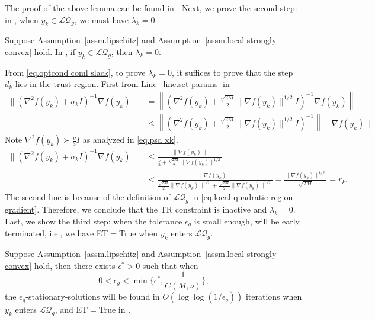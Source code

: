 \documentclass[moor,sglanonrev]{informs4}
\begin{document}
The proof of the above lemma can be found in .
Next, we prove the second step: in , when $y_k\in\mathcal{LQ}_g$, we must have $\lambda_k=0$.
\begin{lemma}
    \label{lem.detection of local quadratic}
    Suppose Assumption~\ref{assm.lipschitz} and Assumption~\ref{assm.local strongly convex} hold. In , if $y_k\in\mathcal{LQ}_g$, then $\lambda_k=0$.
\end{lemma}
From \eqref{eq.optcond coml slack}, to prove $\lambda_k=0$, it suffices to prove that the step $d_k$ lies in the trust region. {\color{red} First from Line~\ref{line.set-params} in }
\begin{equation*}
    \begin{aligned}
        \|(\nabla^2 f(y_k)+\sigma_k I)^{-1}\nabla f(y_k)\| & = \left\|\left (\nabla^2 f(y_k)+\frac{\sqrt{2M}}{2} \|\nabla f(y_k)\|^{1/2} I\right)^{-1}\nabla f(y_k)\right\|         \\
                                                           & \leq \left\|\left (\nabla^2 f(y_k)+\frac{\sqrt{2M}}{2} \|\nabla f(y_k)\|^{1/2} I\right)^{-1}\right\| \|\nabla f(y_k)\|
    \end{aligned}
\end{equation*}
Note $\nabla^2 f(y_k)\succ \frac{\nu}{3} I$ as analyzed in \eqref{eq.psd xk}.
\begin{equation*}
    \begin{aligned}
        \|(\nabla^2 f(y_k)+\sigma_k I)^{-1}\nabla f(y_k)\| & \leq \frac{\|\nabla f(y_k)\|}{\frac{\nu}{3}+\frac{\sqrt{2M}}{2} \|\nabla f(y_k)\|^{1/2}} \\&<\frac{\|\nabla f(y_k)\|}{\frac{\sqrt{2M}}{2}\|\nabla f(y_k)\|^{1/2}+\frac{\sqrt{2M}}{2} \|\nabla f(y_k)\|^{1/2}} =\frac{\|\nabla f(y_k)\|^{1/2}}{\sqrt{2M}} =r_k.
    \end{aligned}
\end{equation*}
The second line is because of the definition of $\mathcal{LQ}_g$ in \eqref{eq.local quadratic region gradient}. Therefore, we conclude that the TR constraint is inactive and $\lambda_k=0$.
\Halmos \endproof
Last, we show the third step: when the tolerance $\epsilon_g$ is small enough,  will be early terminated, i.e., we have ET$=$True when $y_k$ enters $\mathcal{LQ}_g$.
\begin{theorem}
    \label{thm.local quadratic convergence}
    Suppose Assumption~\ref{assm.lipschitz} and Assumption~\ref{assm.local strongly convex} hold, then there exists $\epsilon^* >0$ such that when
    \begin{equation}
        \label{eq.regularity epsilon}
        0<\epsilon_g< \min\{\epsilon^*, \frac{1}{C(M,\nu)}\},
    \end{equation}
    the $\epsilon_g$-stationary-solutions will be found in $O\left(\log\log\left(1/\epsilon_g\right)\right)$ iterations when $y_k$ enters $\mathcal{LQ}_g$, and ET$=$True in .
\end{theorem}
\end{document}
